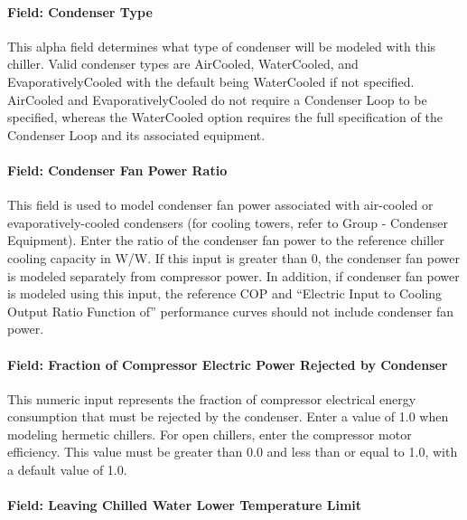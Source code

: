 \paragraph{Field: Condenser Type}\label{field-condenser-type-2-000}

This alpha field determines what type of condenser will be modeled with this chiller. Valid condenser types are AirCooled, WaterCooled, and EvaporativelyCooled with the default being WaterCooled if not specified. AirCooled and EvaporativelyCooled do not require a Condenser Loop to be specified, whereas the WaterCooled option requires the full specification of the Condenser Loop and its associated equipment.

\paragraph{Field: Condenser Fan Power Ratio}\label{field-condenser-fan-power-ratio}

This field is used to model condenser fan power associated with air-cooled or evaporatively-cooled condensers (for cooling towers, refer to Group - Condenser Equipment). Enter the ratio of the condenser fan power to the reference chiller cooling capacity in W/W. If this input is greater than 0, the condenser fan power is modeled separately from compressor power. In addition, if condenser fan power is modeled using this input, the reference COP and ``Electric Input to Cooling Output Ratio Function of'' performance curves should not include condenser fan power.

\paragraph{Field: Fraction of Compressor Electric Power Rejected by Condenser}\label{field-fraction-of-compressor-electric-power-rejected-by-condenser}

This numeric input represents the fraction of compressor electrical energy consumption that must be rejected by the condenser. Enter a value of 1.0 when modeling hermetic chillers. For open chillers, enter the compressor motor efficiency. This value must be greater than 0.0 and less than or equal to 1.0, with a default value of 1.0.

\paragraph{Field: Leaving Chilled Water Lower Temperature Limit}\label{field-leaving-chilled-water-lower-temperature-limit-000}

